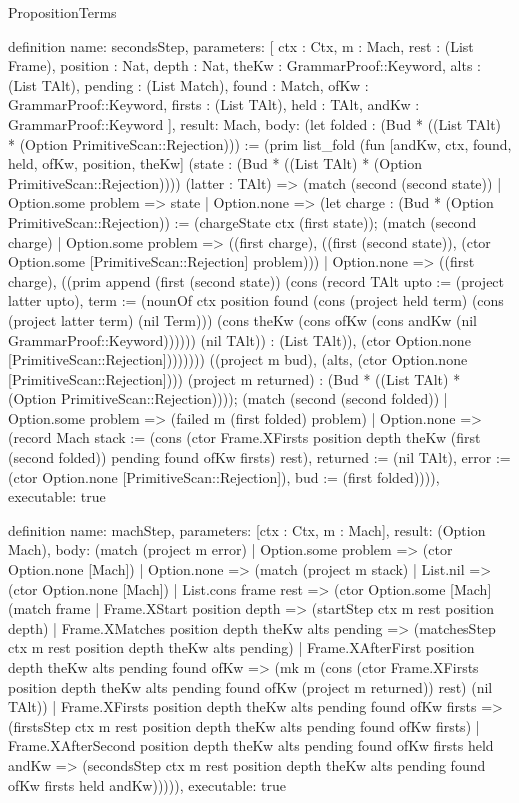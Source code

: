 \begin{lexlean}{PropositionTerms}
\begin{semanticmodule}
definition{
  name: secondsStep,
  parameters: [
    ctx : Ctx,
    m : Mach,
    rest : (List Frame),
    position : Nat,
    depth : Nat,
    theKw : GrammarProof::Keyword,
    alts : (List TAlt),
    pending : (List Match),
    found : Match,
    ofKw : GrammarProof::Keyword,
    firsts : (List TAlt),
    held : TAlt,
    andKw : GrammarProof::Keyword
  ],
  result: Mach,
  body: (let folded : (Bud * ((List TAlt) * (Option PrimitiveScan::Rejection))) := (prim list_fold (fun [andKw, ctx, found, held, ofKw, position, theKw] (state : (Bud * ((List TAlt) * (Option PrimitiveScan::Rejection)))) (latter : TAlt) => (match (second (second state))
    | Option.some problem => state
    | Option.none => (let charge : (Bud * (Option PrimitiveScan::Rejection)) := (chargeState ctx (first state)); (match (second charge)
      | Option.some problem => ((first charge), ((first (second state)), (ctor Option.some [PrimitiveScan::Rejection] problem)))
      | Option.none => ((first charge), ((prim append (first (second state)) (cons (record TAlt {upto := (project latter upto), term := (nounOf ctx position found (cons (project held term) (cons (project latter term) (nil Term))) (cons theKw (cons ofKw (cons andKw (nil GrammarProof::Keyword)))))}) (nil TAlt)) : (List TAlt)), (ctor Option.none [PrimitiveScan::Rejection]))))))) ((project m bud), (alts, (ctor Option.none [PrimitiveScan::Rejection]))) (project m returned) : (Bud * ((List TAlt) * (Option PrimitiveScan::Rejection)))); (match (second (second folded))
    | Option.some problem => (failed m (first folded) problem)
    | Option.none => (record Mach {stack := (cons (ctor Frame.XFirsts position depth theKw (first (second folded)) pending found ofKw firsts) rest), returned := (nil TAlt), error := (ctor Option.none [PrimitiveScan::Rejection]), bud := (first folded)}))),
  executable: true
}

definition{
  name: machStep,
  parameters: [ctx : Ctx, m : Mach],
  result: (Option Mach),
  body: (match (project m error)
    | Option.some problem => (ctor Option.none [Mach])
    | Option.none => (match (project m stack)
      | List.nil => (ctor Option.none [Mach])
      | List.cons frame rest => (ctor Option.some [Mach] (match frame
        | Frame.XStart position depth => (startStep ctx m rest position depth)
        | Frame.XMatches position depth theKw alts pending => (matchesStep ctx m rest position depth theKw alts pending)
        | Frame.XAfterFirst position depth theKw alts pending found ofKw => (mk m (cons (ctor Frame.XFirsts position depth theKw alts pending found ofKw (project m returned)) rest) (nil TAlt))
        | Frame.XFirsts position depth theKw alts pending found ofKw firsts => (firstsStep ctx m rest position depth theKw alts pending found ofKw firsts)
        | Frame.XAfterSecond position depth theKw alts pending found ofKw firsts held andKw => (secondsStep ctx m rest position depth theKw alts pending found ofKw firsts held andKw))))),
  executable: true
}


\end{semanticmodule}
\end{lexlean}
